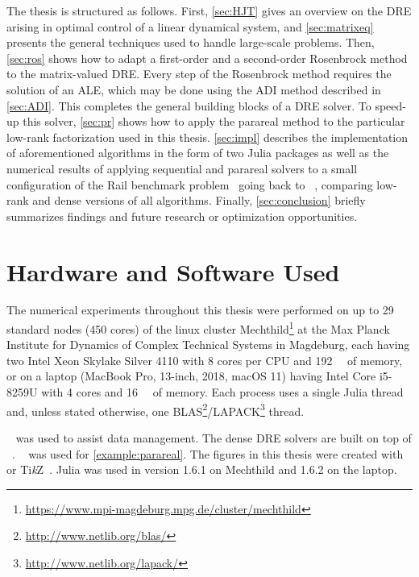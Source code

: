 The thesis is structured as follows.
First, \autoref{sec:HJT} gives an overview on the \ac{DRE} arising in optimal control of a linear dynamical system,
and \autoref{sec:matrixeq} presents the general techniques used to handle large-scale problems.
Then, \autoref{sec:ros} shows how to adapt a first-order and a second-order Rosenbrock method to the matrix-valued \ac{DRE}.
Every step of the Rosenbrock method requires the solution of an \ac{ALE},
which may be done using \eg the \ac{ADI} method described in \autoref{sec:ADI}.
This completes the general building blocks of a \ac{DRE} solver.
To speed-up this solver,
\autoref{sec:pr} shows how to apply the parareal method to the particular low-rank factorization used in this thesis.
\autoref{sec:impl} describes the implementation of aforementioned algorithms in the form of two Julia packages
as well as the numerical results of applying sequential and parareal solvers to
a small configuration of the Rail benchmark problem~\cite{morwiki_steel} going back to \citeauthor{Benner2005}~\cite{Benner2005},
comparing low-rank and dense versions of all algorithms.
Finally, \autoref{sec:conclusion} briefly summarizes findings and future research or optimization opportunities.

\section*{Hardware and Software Used}

The numerical experiments throughout this thesis were performed
on up to 29 standard nodes (450 cores) of the linux cluster Mechthild\footnote{\url{https://www.mpi-magdeburg.mpg.de/cluster/mechthild}}
at the Max Planck Institute for Dynamics of Complex Technical Systems in Magdeburg,
each having
two Intel Xeon Skylake Silver 4110 with 8 cores per CPU
and \SI{192}{\giga\byte} of memory,
or on a laptop (MacBook Pro, 13-inch, 2018, macOS 11) having
Intel Core i5-8259U with 4 cores and \SI{16}{\giga\byte} of memory.
Each process uses a single Julia thread and,
unless stated otherwise, one BLAS\footnote{%
  \url{http://www.netlib.org/blas/}
}/LAPACK\footnote{%
  \url{http://www.netlib.org/lapack/}
} thread.

~\cite{DrWatson} was used to assist data management.
The dense \ac{DRE} solvers are built on top of ~\cite{MatrixEquations}.
~\cite{DifferentialEquations} was used for \autoref{example:parareal}.
The figures in this thesis were created with
~\cite{Makie} or Ti\emph{k}Z~\cite{TikZ}.
Julia was used in version 1.6.1 on Mechthild and 1.6.2 on the laptop.


